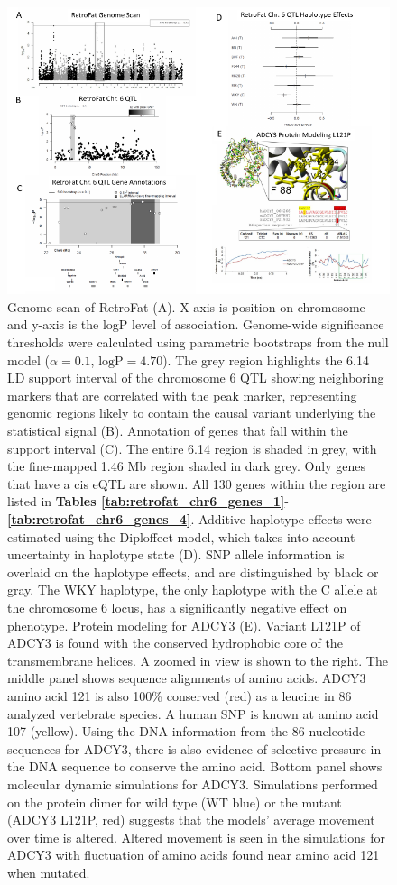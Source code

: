 \begin{figure}
\centering
\includegraphics[trim={0in 0in 0in 0in}, clip, width=\textwidth]{figures/5-hsrats/Figure3-alt.pdf}
\caption[RetroFat chromosome 6 QTL and subsequent fine-mapping analyses]{Genome scan of RetroFat (A). X-axis is position on chromosome and y-axis is the logP level of association.  Genome-wide significance thresholds were calculated using parametric bootstraps from the null model ($\alpha=0.1$, $\text{logP} = 4.70$). The grey region highlights the 6.14 LD support interval of the chromosome 6 QTL showing neighboring markers that are correlated with the peak marker, representing genomic regions likely to contain the causal variant underlying the statistical signal (B). Annotation of genes that fall within the support interval (C). The entire 6.14 region is shaded in grey, with the fine-mapped 1.46 Mb region shaded in dark grey. Only genes that have a cis eQTL are shown.  All 130 genes within the region are listed in \textbf{Tables \ref{tab:retrofat_chr6_genes_1}}-\textbf{\ref{tab:retrofat_chr6_genes_4}}. Additive haplotype effects were estimated using the Diploffect model, which takes into account uncertainty in haplotype state (D). SNP allele information is overlaid on the haplotype effects, and are distinguished by black or gray. The WKY haplotype, the only haplotype with the C allele at the chromosome 6 locus, has a significantly negative effect on phenotype. Protein modeling for ADCY3 (E). Variant L121P of ADCY3 is found with the conserved hydrophobic core of the transmembrane helices.  A zoomed in view is shown to the right.  The middle panel shows sequence alignments of amino acids. ADCY3 amino acid 121 is also 100\% conserved (red) as a leucine in 86 analyzed vertebrate species. A human SNP is known at amino acid 107 (yellow). Using the DNA information from the 86 nucleotide sequences for ADCY3, there is also evidence of selective pressure in the DNA sequence to conserve the amino acid. Bottom panel shows molecular dynamic simulations for ADCY3. Simulations performed on the protein dimer for wild type (WT blue) or the mutant (ADCY3 L121P, red) suggests that the models' average movement over time is altered. Altered movement is seen in the simulations for ADCY3 with fluctuation of amino acids found near amino acid 121 when mutated. \label{fig:retrofat_chr6}}
\end{figure}

